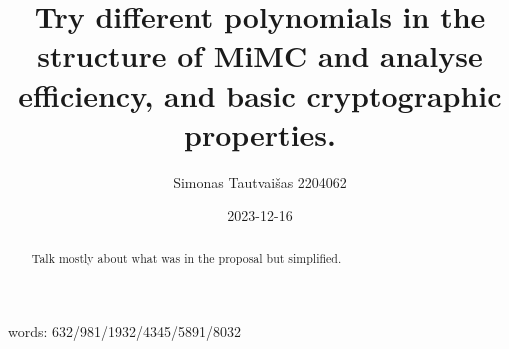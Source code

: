 \documentclass{Resources/UoBLab1}
\theoremstyle{definition}
\begin{document}

\title{Try different polynomials in the structure of MiMC and analyse efficiency, and basic cryptographic properties.}
\author{Simonas Tautvaišas 2204062}
\date{2023-12-16}

\maketitle


words: 632/981/1932/4345/5891/8032

\begin{abstract}
    Talk mostly about what was in the proposal but simplified.
\end{abstract}

\end{document}
